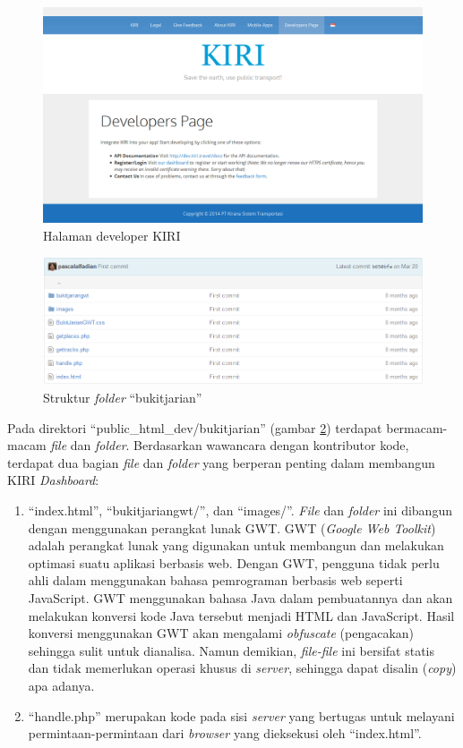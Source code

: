 \documentclass[a4paper,twoside]{article}
\begin{document}
\begin{enumerate}
\begin{figure}[htbp]
	\centering
		\includegraphics[scale=0.35]{Gambar/3_developer.png}
	\caption{Halaman developer KIRI}
	\label{fig:3_developer}
\end{figure}

\begin{figure}[htbp]
	\centering
		\includegraphics[scale=0.5]{Gambar/3_bukit_jarian.png}
	\caption{Struktur \textit{folder} ``bukitjarian''}
	\label{fig:3_bukit_jarian}
\end{figure}

Pada direktori ``public\_html\_dev/bukitjarian'' (gambar \ref{fig:3_bukit_jarian}) terdapat bermacam-macam \textit{file} dan \textit{folder}. Berdasarkan wawancara dengan kontributor kode, terdapat dua bagian \textit{file} dan \textit{folder} yang berperan penting dalam membangun KIRI \textit{Dashboard}:
\begin{enumerate}
	\item ``index.html'', ``bukitjariangwt/'', dan ``images/''. \textit{File} dan \textit{folder} ini dibangun dengan menggunakan perangkat lunak GWT. GWT (\textit{Google Web Toolkit}) adalah perangkat lunak yang digunakan untuk membangun dan melakukan optimasi suatu aplikasi berbasis web\cite{gwt}. Dengan GWT, pengguna tidak perlu ahli dalam menggunakan bahasa pemrograman berbasis web seperti JavaScript. GWT menggunakan bahasa Java dalam pembuatannya dan akan melakukan konversi kode Java tersebut menjadi HTML dan JavaScript. Hasil konversi menggunakan GWT akan mengalami \textit{obfuscate} (pengacakan) sehingga sulit untuk dianalisa. Namun demikian, \textit{file-file} ini bersifat statis dan tidak memerlukan operasi khusus di \textit{server}, sehingga dapat disalin (\textit{copy}) apa adanya. 
	\item ``handle.php'' merupakan kode pada sisi \textit{server} yang bertugas untuk melayani permintaan-permintaan dari \textit{browser} yang dieksekusi oleh ``index.html''.
\end{enumerate}


\end{enumerate}
\end{document}
